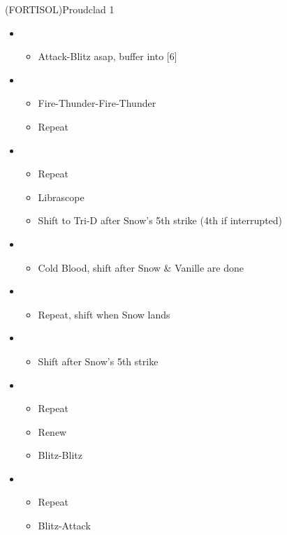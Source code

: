 \begin{battle}[1:16]{(FORTISOL)Proudclad 1}
	\begin{itemize}
		\item \second
		      \begin{itemize}
			      \item Attack-Blitz asap, buffer into [6]
		      \end{itemize}
		\item \sixth
			\begin{itemize}
				\item Fire-Thunder-Fire-Thunder
				\item Repeat
			\end{itemize}
		\item \fifth
			\begin{itemize}
				\item Repeat
				\item Librascope
				\item Shift to Tri-D after Snow's 5th strike (4th if interrupted)
			\end{itemize}
		\item \sixth
			\begin{itemize}
				\item Cold Blood, shift after Snow \& Vanille are done
			\end{itemize}
		\item \fifth
			\begin{itemize}
				\item Repeat, shift when Snow lands
			\end{itemize}
		\item \sixth
			\begin{itemize}
				\item Shift after Snow's 5th strike
			\end{itemize}
		\item \first
			\begin{itemize}
				\item Repeat
				\item Renew
				\item Blitz-Blitz
			\end{itemize}
		\item \second
			\begin{itemize}
				\item Repeat
				\item Blitz-Attack
			\end{itemize}
	\end{itemize}
\end{battle}
\vfill

